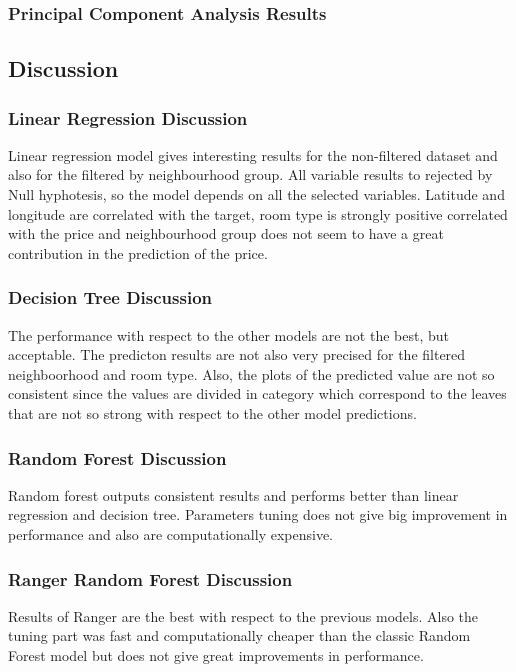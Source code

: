 \documentclass{FR16}
\begin{document}
\subsubsection{Principal Component Analysis Results}

\newpage
\subsection{Discussion}

\subsubsection{Linear Regression Discussion}
Linear regression model gives interesting results for the non-filtered dataset and also for the filtered by neighbourhood group.
All variable results to rejected by Null hyphotesis, so the model depends on all the selected variables.
Latitude and longitude are correlated with the target, room type is strongly positive correlated with the price and neighbourhood group does not seem to have
a great contribution in the prediction of the price.
\\

\subsubsection{Decision Tree Discussion}
The performance with respect to the other models are not the best, but acceptable. The predicton results are not also very precised for the filtered neighboorhood 
and room type. Also, the plots of the predicted value are not so consistent since the values are divided in category which correspond to the leaves that are not so strong
with respect to the other model predictions.
\\

\subsubsection{Random Forest Discussion}
Random forest outputs consistent results and performs  better than linear regression and decision tree. 
Parameters tuning does not give big improvement in performance and also are computationally expensive.
\\

\subsubsection{Ranger Random Forest Discussion}
Results of Ranger are the best with respect to the previous models. Also the tuning part was fast and computationally cheaper than 
the classic Random Forest model but does not give great improvements in performance.
\\
\end{document}
